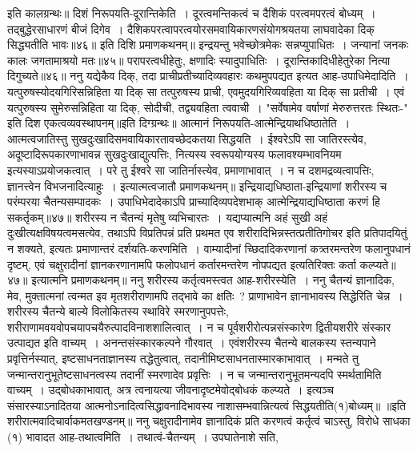 इति कालग्रन्थः॥
दिशं निरूपयति-दूरान्तिकेति~। दूरत्वमन्तिकत्वं च दैशिकं परत्वमपरत्वं बोध्यम्~। तद्बुद्धेरसाधारणं बीजं दिगेव~। दैशिकपरत्वापरत्वयोरसमवायिकारणसंयोगश्रयतया
लाघवादेका दिक् सिद्ध्यतीति भावः॥४६॥
इति दिशि प्रमाणकथनम्॥
इन्द्रयन्तु भवेच्छोत्रमेकः सन्नप्युपाधितः~।
जन्यानां जनकः कालः जगतामाश्रयो मतः॥४५॥
परापरत्वधीहेतुः, क्षणादिः स्यादुपाधितिः~।
दूरान्तिकादिधीहेतुरेका नित्या दिगुच्यते॥४६॥
ननु यद्येकैव दिक्, तदा प्राचीप्रतीच्यादिव्यवहारः कथमुपपद्यत इत्यत आह-उपाधिमेदादिति~। यत्पुरुषस्योदयगिरिसन्निहिता या दिक् सा तत्पुरुषस्य प्राची,
एवमुदयगिरिव्यवहिता या दिक् सा प्रतीची~। एवं यत्पुरुषस्य सुमेरुसन्निहिता या दिक्, सोदीची, तद्व्यवहिता त्ववाची~। "सर्वेषामेव वर्षाणां मेरुरुत्तरतः स्थितः-" इति दिश
एकत्वव्यवस्थापनम्॥इति दिग्ग्रन्थः॥
आत्मानं निरूपयति-आत्मेन्द्रियाथधिष्ठातेति~। आत्मत्वजातिस्तु सुखदुःखादिसमवायिकारतावच्छेदकतया सिद्धयति~। ईश्वरेऽपि सा जातिरस्त्येव, अदूष्टादिरूपकारणाभावन्न
सुखदुःखाद्युत्पत्तिः, नित्यस्य स्वरूपयोग्यस्य फलावश्यम्भावनियम इत्यस्याऽप्रयोजकत्वात्~।
परे तु ईश्वरे सा जातिर्नास्त्येव, प्रमाणाभावात्~। न च दशमद्रव्यत्वापत्तिः, ज्ञानत्त्वेन विभजनादित्याहुः~। इत्यात्मत्वजातौ प्रमाणकथनम्॥
इन्द्रियाद्यधिष्ठाता-इन्द्रियाणां शरीरस्य च परंम्परया चैतन्यसम्पादकः~।
उपाधिभेदादेकाऽपि प्राच्यादिव्यपदेशभाक्
आत्मेन्द्रियाद्यधिष्ठाता करणं हि सकर्तृकम्॥४७॥
शरीरस्य न चैतन्यं मृतेषु व्यभिचारतः~।
यद्यप्यात्मनि अहं सुखी अहं दुःखीत्यक्षविषयत्वमसत्येव, तथाऽपि विप्रतिपन्नं प्रति प्रथमत एव शरीरादिभिन्नस्तत्प्रतीतिगोचर इति प्रतिपादयितुं न शक्यते, इत्यतः
प्रमाणान्तरं दर्शयति-करणमिति~। वाम्यादीनां च्छिदादिकरणानां कत्र्तरमन्तरेण फलानुपधानं दृष्टम्, एवं चक्षुरादीनां ज्ञानकरणानामपि फलोपधानं कर्तारमन्तरेण नोपपद्यत
इत्यतिरिक्तः कर्ता कल्प्यते॥४७॥
इत्यात्मनि प्रमाणकथनम्॥
ननु शरीरस्य कर्तृत्वमस्त्वत आह-शरीरस्येति~। ननु चैतन्यं ज्ञानादिक, मेव, मुक्तात्मनां त्वन्मत इव मृतशरीराणामपि तद्भावे का क्षतिः~? प्राणाभावेन
ज्ञानाभावस्य सिद्धेरिति चेन्न~। शरीरस्य चैतन्ये बाल्ये विलोकितस्य स्थाविरे स्मरणानुपपत्तेः, शरीराणामवयवोपचयापचयैरुत्पादविनाशशालित्वात्~। न च पूर्वशरीरोत्पन्नसंस्कारेण
द्वितीयशरीरे संस्कार उत्पाद्यत इति वाच्यम्~। अनन्तसंस्कारकल्पने गौरवात्~। एवंशरीरस्य चैतन्ये बालकस्य स्तन्यपाने प्रवृत्तिर्नस्यात्, इष्टसाधनताज्ञानस्य तद्धेतुत्वात्,
तदानीमिष्टसाधनतास्मारकाभावात्~। मन्मते तु जन्मान्तरानुभूतेष्टसाधनत्वस्य तदानीं स्मरणादेव प्रवृत्तिः~। न च जन्मान्तरानुभूतमन्यदपि स्मर्थतामिति वाच्यम्~। उद्बोधकाभावात्,
अत्र त्वनायत्या जीवनादृष्टमेवोद्बोधकं कल्प्यते~। इत्यञ्च संसारस्याऽनादितया आत्मनोऽनादित्वसिद्धावनादिभावस्य नाशासम्भवान्नित्यत्वं सिद्धयतीति(१)बोध्यम्॥
॥इति शरीरात्मवादिचार्वाकमतखण्डनम्॥
ननु चक्षुरादीनामेव ज्ञानादिकं प्रति करणत्वं कर्तृत्वं चाऽस्तु, विरोधे साधका (१) भावादत आह-तथात्वमिति~। तथात्वं-चैतन्यम्~। उपघातेनाशे सति,
